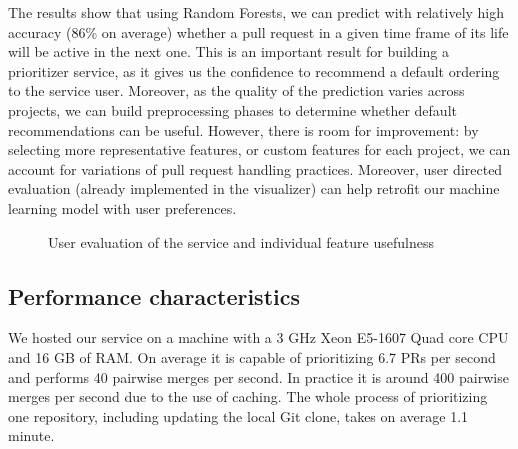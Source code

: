 \documentclass[conference]{IEEEtran}
\begin{document}
%

The results show that using Random Forests, we can predict with relatively
high accuracy (86\% on average) whether a pull request in a given time frame
of its life will be active in the next one. This is an important result
for building a prioritizer service, as it gives us the confidence to
recommend a default ordering to the service user. Moreover, as the
quality of the prediction varies across projects, we can build preprocessing
phases to determine whether default recommendations can be useful.
However, there is room for improvement: by selecting more representative
features, or custom features for each project, we can account for variations
of pull request handling practices. Moreover, user directed evaluation (already
implemented in the visualizer) can help retrofit our machine learning model
with user preferences.

\begin{figure}[t]
\centering
{}
\caption{User evaluation of the service and individual feature usefulness}
\label{fig:user-evaluation}
\end{figure}

\subsection{Performance characteristics}

We hosted our service on a machine with a 3 GHz Xeon E5-1607 Quad 
core CPU and 16 GB of RAM. On average it is capable of prioritizing
6.7 PRs per second and performs 40 pairwise merges per second. In
practice it is around 400 pairwise merges per second due to the use of caching.
The whole process of prioritizing one repository, including updating the local Git clone, takes on average
1.1 minute. 
\end{document}
